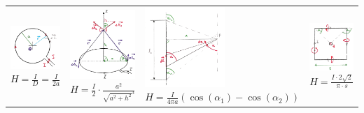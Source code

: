 \begin{tabular}{llll}
\parbox{4.5cm}{
	\includegraphics[width=2.7cm]{./images/biot1.png} \\
	$H =\frac{I}{D} = \frac{I}{2a}$}
& \parbox{4.5cm}{
	\includegraphics[width=2.7cm]{./images/biot2.png} \\
	$H=\frac{I}{2} \cdot \frac{a^2}{\sqrt{a^2+h^2}^3}$}
& \parbox{4.5cm}{
	\includegraphics[width=3cm]{./images/biot3.png} \\
	$H=\frac{I}{4\pi a}(\cos(\alpha_1)- \cos(\alpha_2))$}
& \parbox{4.5cm}{
	\includegraphics[width=2.7cm]{./images/biot4.png} \\
	$H= \frac{I \cdot 2 \sqrt{2}}{\pi \cdot s}$ }
\end{tabular}

